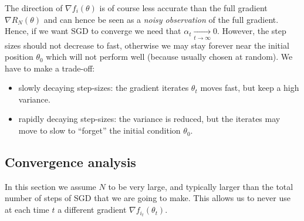 \documentclass[11pt,nocut]{article}
\begin{document}
The direction of $\nabla f_i(\theta)$ is of course less accurate than the full gradient $\nabla R_N(\theta)$ and can hence be seen as a \emph{noisy observation} of the full gradient.
Hence, if we want SGD to converge we need that $\alpha_t \xrightarrow[t \to \infty]{} 0$. However, the step sizes should not decrease to fast, otherwise we may stay forever near the initial position $\theta_0$ which will not perform well (because usually chosen at random).
We have to make a trade-off:
\begin{itemize}
	\item slowly decaying step-sizes: the gradient iterates $\theta_t$ moves fast, but keep a high variance.
	\item rapidly decaying step-sizes: the variance is reduced, but the iterates may move to slow to ``forget'' the initial condition $\theta_0$.
\end{itemize}

\subsection{Convergence analysis}

In this section we assume $N$ to be very large, and typically larger than the total number of steps of SGD that we are going to make. This allows us to never use at each time $t$ a different gradient $\nabla f_{i_t}(\theta_t)$.
\end{document}
